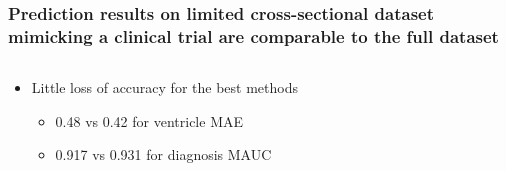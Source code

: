 \documentclass[8pt,xcolor=table,aspectratio=169]{beamer}
\begin{document}
\begin{frame}
\begin{columns}
\begin{column}[t]{0.5\textwidth}
\begin{table}
\begin{tabular}{lc|cc|cc|cc}
\end{tabular}

\end{table}
\end{column}

\end{columns}






\end{frame}



\begin{frame}
\frametitle{Prediction results on limited cross-sectional dataset mimicking a clinical trial are comparable to the full dataset}

\begin{columns}[t]
\begin{column}[t]{0.4\textwidth}
 \begin{itemize}
 \item Little loss of accuracy for the best methods 
 \begin{itemize}
  \item 0.48 vs 0.42 for ventricle MAE
  \item 0.917 vs 0.931 for diagnosis MAUC
 \end{itemize}
 
 \vspace{2em}
 

\end{itemize}
\end{column}
\end{columns}
\end{frame}
\end{document}
